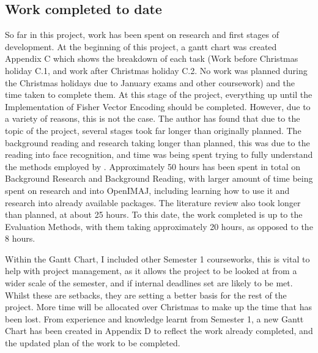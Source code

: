 \documentclass[12pt, a4paper]{article}
\begin{document}
\subsection{Work completed to date}
So far in this project, work has been spent on research and first stages of development. At the beginning of this project, a gantt chart was created Appendix C which shows the breakdown of each task (Work before Christmas holiday C.1, and work after Christmas holiday C.2. No work was planned during the Christmas holidays due to January exams and other coursework) and the time taken to complete them. At this stage of the project, everything up until the Implementation of Fisher Vector Encoding should be completed. However, due to a variety of reasons, this is not the case. The author has found that due to the topic of the project, several stages took far longer than originally planned. The background reading and research  taking longer than planned, this was due to the reading into face recognition, and time was being spent trying to fully understand the methods employed by \cite{simonyan2004fisher}. Approximately 50 hours has been spent in total on Background Research and Background Reading, with larger amount of time being spent on research and into OpenIMAJ, including learning how to use it and research into already available packages. The literature review also took longer than planned, at about 25 hours. To this date, the work completed is up to the Evaluation Methods, with them taking approximately 20 hours, as opposed to the 8 hours. 

Within the Gantt Chart, I included other Semester 1 courseworks, this is vital to help with project management, as it allows the project to be looked at from a wider scale of the semester, and if internal deadlines set are likely to be met.
Whilst these are setbacks, they are setting a better basis for the rest of the project. More time will be allocated over Christmas to make up the time that has been lost. From experience and knowledge learnt from Semester 1, a new Gantt Chart has been created in Appendix D to reflect the work already completed, and the updated plan of the work to be completed. 
\newpage
\end{document}
